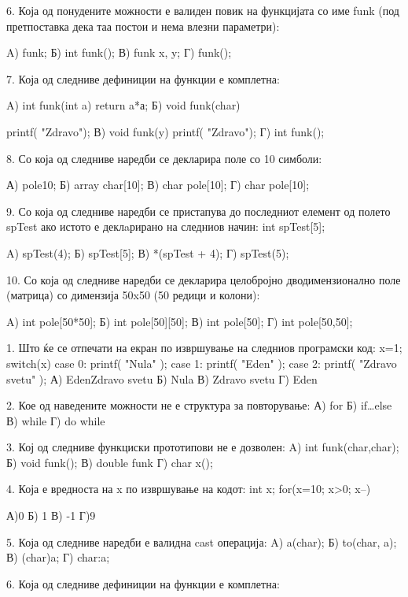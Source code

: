 {{6. Која од понудените можности е валиден повик на функцијата со име funk (под претпоставка дека таа постои и нема влезни параметри):

A) funk;                    Б) int funk();
В) funk x, y;               Г) funk();

7. Која од следниве дефиниции на функции е комплетна:

A) int funk(int a) {return a*а;}        
Б) void funk(char) { printf( "Zdravo");
В) void funk(y) { printf( "Zdravo"); } 
Г) int funk();

8. Со која од следниве наредби се декларира поле со 10 симболи:

А) pole{10};                    Б) array char[10];
В) char pole[10];               Г) char pole[10];

9. Со која од следниве наредби се пристапува до последниот елемент од полето spTest ако истото е деклaрирано на следниов начин: int spTest[5];

A) spTest(4);                   Б) spTest[5];
В) *(spTest + 4);               Г) spTest(5);

10. Со која од следниве наредби се декларира целобројно дводимензионално поле (матрица) со димензија 50x50 (50 редици и колони):

A) int pole[50*50];         Б) int pole[50][50];
В) int pole[50];            Г) int pole[50,50];

1. Што ќе се отпечати на екран по извршување на следниов програмски код:
x=1;
switch(x)
{
  case 0: printf( "Nula" );
  case 1: printf( "Eden" );
  case 2: printf( "Zdravo svetu" );
}
А) EdenZdravo svetu                 Б) Nula
В) Zdravo svetu                 Г) Eden   

2. Кое од наведените можности не е структура за повторување:
А) for                  Б) if…else 
В) while                    Г) do while

3. Кој од следниве функциски прототипови не е дозволен:
A) int funk(char,char);     Б) void funk();
В) double funk              Г) char x();

4. Која е вредноста на x по извршување на кодот: 
int x; for(x=10; x>0; x--) {} 

А)0                     Б) 1
В) -1                       Г)9

5. Која од следниве наредби е валидна cast операција:
A) a(char);                 Б) to(char, a);
В) (char)a;                 Г) char:a;

6. Која од следниве дефиниции на функции е комплетна:

}}}
